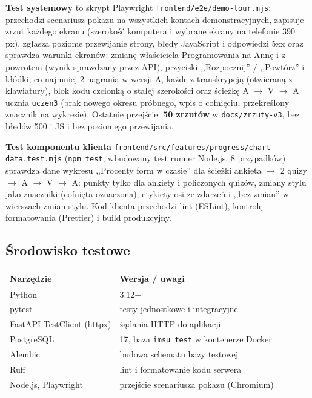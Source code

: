 \textbf{Test systemowy} to skrypt Playwright \nolinkurl{frontend/e2e/demo-tour.mjs}: przechodzi scenariusz pokazu na wszystkich kontach demonstracyjnych, zapisuje zrzut każdego ekranu (szerokość komputera i wybrane ekrany na telefonie 390 px), zgłasza poziome przewijanie strony, błędy JavaScript i odpowiedzi 5xx oraz sprawdza warunki ekranów: zmianę właściciela Programowania na Annę i z powrotem (wynik sprawdzany przez API), przyciski ,,Rozpocznij'' / ,,Powtórz'' i kłódki, co najmniej 2 nagrania w wersji A, każde z transkrypcją (otwieraną z klawiatury), blok kodu czcionką o stałej szerokości oraz ścieżkę A $\to$ V $\to$ A ucznia \texttt{uczen3} (brak nowego okresu próbnego, wpis o cofnięciu, przekreślony znacznik na wykresie). Ostatnie przejście: \textbf{50 zrzutów} w \nolinkurl{docs/zrzuty-v3}, bez błędów 500 i JS i bez poziomego przewijania.

\textbf{Test komponentu klienta} \nolinkurl{frontend/src/features/progress/chart-data.test.mjs} (\texttt{npm test}, wbudowany test runner Node.js, 8 przypadków) sprawdza dane wykresu ,,Procenty form w czasie'' dla ścieżki ankieta $\to$ 2 quizy $\to$ A $\to$ V $\to$ A: punkty tylko dla ankiety i policzonych quizów, zmiany stylu jako znaczniki (cofnięta oznaczona), etykiety osi ze zdarzeń i ,,bez zmian'' w wierszach zmian stylu. Kod klienta przechodzi lint (ESLint), kontrolę formatowania (Prettier) i build produkcyjny.

\subsection{Środowisko testowe}

\begin{center}
\begin{tabular}{ll}
\toprule
\textbf{Narzędzie} & \textbf{Wersja / uwagi} \\
\midrule
Python & 3.12+ \\
pytest & testy jednostkowe i integracyjne \\
FastAPI TestClient (httpx) & żądania HTTP do aplikacji \\
PostgreSQL & 17, baza \texttt{imsu\_test} w kontenerze Docker \\
Alembic & budowa schematu bazy testowej \\
Ruff & lint i formatowanie kodu serwera \\
Node.js, Playwright & przejście scenariusza pokazu (Chromium) \\
\bottomrule
\end{tabular}
\end{center}

